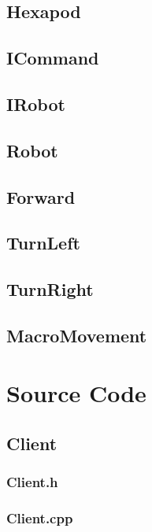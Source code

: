 \subsection{Hexapod}


\subsection{ICommand}

\subsection{IRobot}

\subsection{Robot}

\subsection{Forward}

\subsection{TurnLeft}

\subsection{TurnRight}

\subsection{MacroMovement}


\section{Source Code}
\subsection{Client}
\subsubsection{Client.h}
\subsubsection{Client.cpp} 
\newpage

